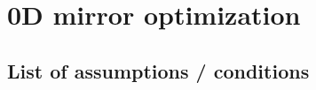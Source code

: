 \graphicspath{{Appendix/appendix_0d-mirror/}}

\newcommand{\kunal}[1]{\marker{green}{Kunal}{#1}}  %
\newcommand{\bad}[1]{\marker{red}{problem}{#1}} 

\chapter{0D mirror optimization}
\label{app:0d-mirror}

%


\section{List of assumptions / conditions}

